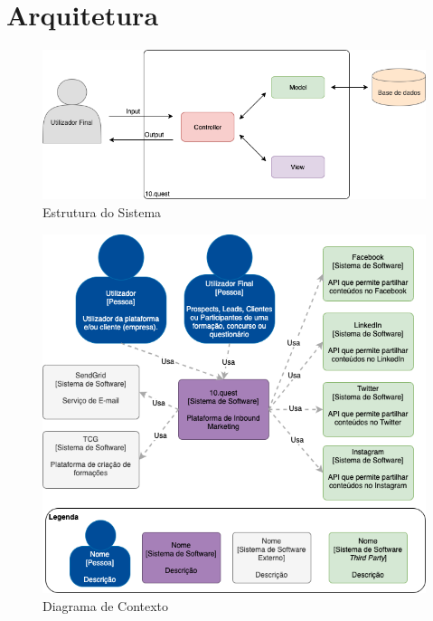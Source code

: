  \chapter{Arquitetura}
\label{sec:arquitetura}


\begin{figure}[ht!]
	\begin{center}
		\includegraphics[width=1\textwidth]{img/arq/diagrama-MVC}
		\caption{Estrutura do Sistema}
		\label{fig:arq-mvc}
	\end{center}
\end{figure}

\begin{figure}[ht!]
	\begin{center}
		\includegraphics[width=1\textwidth]{img/arq/diagrama-contexto}
		\caption{Diagrama de Contexto}
		\label{fig:arq-contexto}
	\end{center}
\end{figure}

